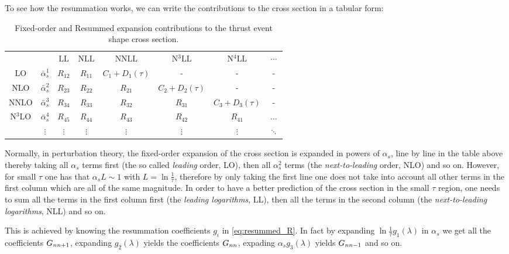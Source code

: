 \documentclass[../Tesi_Jiahao_Miao_986136.tex]{subfiles}
\begin{document}
To see how the resummation works, we can write the contributions to the cross section in a tabular form:

\begin{table}[h]
    \centering
    \caption{Fixed-order and Resummed expansion contributions to the thrust event shape cross section.}
    \label{tab:resummed vs fixed-order}
    \begin{tabular}{c c c c c c c c}
        &&\(\text{LL}\) & \(\text{NLL}\) &\(\text{NNLL}\) & \(\text{N$^3$LL}\) & \(\text{N$^4$LL}\) & \(\cdots\)\\
        \(\text{LO}\)&\(\bar{\alpha}_s^1\) &\(R_{12}\) & \(R_{11}\) & \(C_1+D_1(\tau)\) & -  & - &  - \\
        \(\text{NLO}\)&\(\bar{\alpha}_s^2\) & \(R_{23}\) & \(R_{22}\) & \(R_{21}\) & \(C_2 + D_2(\tau)\) & - & -  \\
        \(\text{NNLO}\)&\(\bar{\alpha}_s^3\) & \(R_{34}\) & \(R_{33}\) & \(R_{32}\) & \(R_{31}\) & \(C_3 + D_3(\tau)\) & -  \\
        \(\text{N$^3$LO}\)&\(\bar{\alpha}_s^4\) & \(R_{45}\) & \(R_{44}\) & \(R_{43}\) & \(R_{42}\) & \(R_{41}\) & \(\dots\) \\
        & \(\vdots\) & \(\vdots\) & \(\vdots\) & \(\vdots\) & \(\vdots\) & \(\vdots\) & \(\ddots\) 
    \end{tabular}
      
\end{table}

Normally, in perturbation theory, the fixed-order expansion of the cross section is expanded in powers of $\alpha_s$, 
line by line in the table above thereby taking all $\alpha_s$ terms first (the so called \emph{leading} order, LO), then all $\alpha_s^2$ terms (the \emph{next-to-leading} order, NLO) and so on.
However, for small $\tau$ one has that $\alpha_s L\sim 1$ with $L = \ln \frac{1}{\tau}$, therefore by only taking the first line one does not
take into account all other terms in the first column which are all of the same magnitude. 
In order to have a better prediction of the cross section in the small $\tau$ region, one needs to sum all the terms in the first column first (the \emph{leading logarithms}, LL),
then all the terms in the second column (the \emph{next-to-leading logarithms}, NLL) and so on.


This is achieved by knowing the resummation coefficients $g_i$ in \cref{eq:resummed_R}. In fact by expanding $\ln\frac{1}{\tau} g_1(\lambda)$ in $\alpha_s$ we get all the coefficients $G_{n\space n+1}$, expanding
$g_2(\lambda)$ yields the coefficients $G_{n\space n}$, expading $\alpha_s g_3(\lambda) $ yields $G_{n \space n-1}$ and so on.
\end{document}
